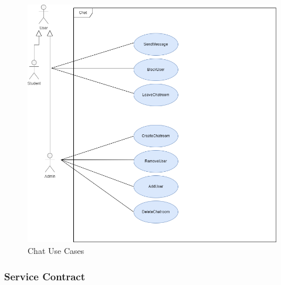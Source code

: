 \documentclass[hidelinks, 12pt, a4paper]{article}
\begin{document}
                    \begin{figure}[H]
                    
                        \centering
                        \includegraphics[width = 15cm]{images/Chat Usecase.drawio.png}
                        \caption{Chat Use Cases}
                        \label{fig:User UseCases}
                        
                    \end{figure}
         \newpage           
                \subsubsection{Service Contract}
            
\end{document}
